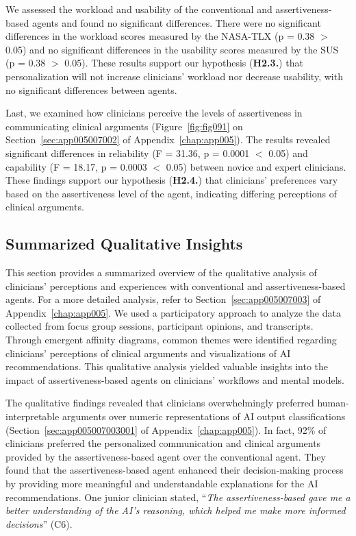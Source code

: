 We assessed the workload and usability of the conventional and assertiveness-based agents and found no significant differences.
There were no significant differences in the workload scores measured by the \ac{NASA-TLX} (p = 0.38 $>$ 0.05) and no significant differences in the usability scores measured by the \ac{SUS} (p = 0.38 $>$ 0.05).
These results support our hypothesis ({\bf H2.3.}) that personalization will not increase clinicians' workload nor decrease usability, with no significant differences between agents.

Last, we examined how clinicians perceive the levels of assertiveness in communicating clinical arguments (Figure~\ref{fig:fig091} on Section~\ref{sec:app005007002} of Appendix~\ref{chap:app005}).
The results revealed significant differences in reliability (F = 31.36, p = 0.0001 $<$ 0.05) and capability (F = 18.17, p = 0.0003 $<$ 0.05) between novice and expert clinicians.
These findings support our hypothesis ({\bf H2.4.}) that clinicians' preferences vary based on the assertiveness level of the agent, indicating differing perceptions of clinical arguments.

\subsection{Summarized Qualitative Insights}
\label{sec:chap006006003}

This section provides a summarized overview of the qualitative analysis of clinicians' perceptions and experiences with conventional and assertiveness-based agents.
For a more detailed analysis, refer to Section~\ref{sec:app005007003} of Appendix~\ref{chap:app005}.
We used a participatory approach to analyze the data collected from focus group sessions, participant opinions, and transcripts.
Through emergent affinity diagrams, common themes were identified regarding clinicians' perceptions of clinical arguments and visualizations of \ac{AI} recommendations.
This qualitative analysis yielded valuable insights into the impact of assertiveness-based agents on clinicians' workflows and mental models.

The qualitative findings revealed that clinicians overwhelmingly preferred human-interpretable arguments over numeric representations of \ac{AI} output classifications (Section~\ref{sec:app005007003001} of Appendix~\ref{chap:app005}).
In fact, 92\% of clinicians preferred the personalized communication and clinical arguments provided by the assertiveness-based agent over the conventional agent.
They found that the assertiveness-based agent enhanced their decision-making process by providing more meaningful and understandable explanations for the \ac{AI} recommendations.
One junior clinician stated, ``{\it The assertiveness-based gave me a better understanding of the AI's reasoning, which helped me make more informed decisions}'' (C6).

